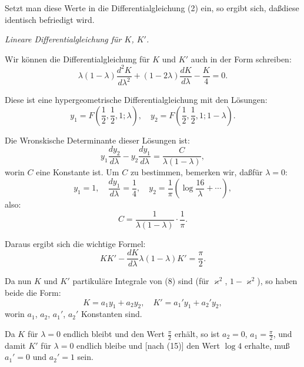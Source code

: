 \documentclass[12pt,a4paper]{article}
\theoremstyle{definition}
\begin{document}
Setzt man diese Werte in die Differentialgleichung (2) ein,
so ergibt sich, da\ss diese identisch befriedigt wird.

\textit{Lineare Differentialgleichung f\"{u}r $K$, $K'$.}

Wir k\"{o}nnen die Differentialgleichung f\"{u}r $K$ und $K'$ auch
in der Form schreiben:
\begin{equation}\tag{9}
\lambda(1-\lambda)\frac{d^2K}{d\lambda^2} + (1-2\lambda)\frac{dK}{d\lambda} - \frac{K}{4} = 0.
\end{equation}

Diese ist eine hypergeometrische Differentialgleichung mit
den L\"{o}sungen:
\begin{equation}\tag{10}
y_1 = F\left(\frac{1}{2}, \frac{1}{2}, 1; \lambda\right), \quad
y_2 = F\left(\frac{1}{2}, \frac{1}{2}, 1; 1-\lambda\right).
\end{equation}

Die Wronskische Determinante dieser L\"{o}sungen ist:
\begin{equation}\tag{11}
y_1\frac{dy_2}{d\lambda} - y_2\frac{dy_1}{d\lambda} = \frac{C}{\lambda(1-\lambda)},
\end{equation}
worin $C$ eine Konstante ist. Um $C$ zu bestimmen, bemerken
wir, da\ss f\"{u}r $\lambda = 0$:
\begin{equation}\tag{12}
y_1 = 1, \quad \frac{dy_1}{d\lambda} = \frac{1}{4}, \quad
y_2 = \frac{1}{\pi}\left(\log\frac{16}{\lambda} + \cdots\right),
\end{equation}
also:
\begin{equation}\tag{13}
C = \frac{1}{\lambda(1-\lambda)} \cdot \frac{1}{\pi}.
\end{equation}

Daraus ergibt sich die wichtige Formel:
\begin{equation}\tag{14}
KK' - \frac{dK}{d\lambda}\lambda(1-\lambda)K' = \frac{\pi}{2}.
\end{equation}

Da nun $K$ und $K'$ partikul\"{a}re Integrale von (8) sind (f\"{u}r
$\varkappa^2$, $1 - \varkappa^2$), so haben beide die Form:
\[
K = a_1y_1 + a_2y_2, \quad K' = a_1'y_1 + a_2'y_2,
\]
worin $a_1$, $a_2$, $a_1'$, $a_2'$ Konstanten sind.

Da $K$ f\"{u}r $\lambda = 0$ endlich bleibt und den Wert $\frac{\pi}{2}$ erh\"{a}lt, so
ist $a_2 = 0$, $a_1 = \frac{\pi}{2}$, und damit $K'$ f\"{u}r $\lambda = 0$ endlich
bleibe und [nach (15)] den Wert $\log 4$ erhalte, mu\ss $a_1' = 0$
und $a_2' = 1$ sein.
\end{document}
